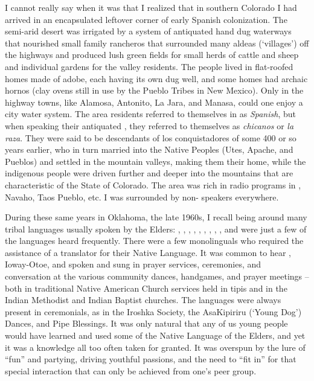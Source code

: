 \documentclass[output=paper]{LSP/langsci}
\begin{document}
I cannot really say when it was that I realized that in southern Colorado I had arrived in an encapsulated leftover corner of early Spanish colonization. The semi-arid desert was irrigated by a system of antiquated hand dug waterways that nourished small family rancheros that surrounded many aldeas (`villages') off the highways and produced lush green fields for small herds of cattle and sheep and individual gardens for the valley residents. The people lived in flat-roofed homes made of adobe, each having its own dug well, and some homes had archaic hornos (clay ovens still in use by the Pueblo Tribes in New Mexico). Only in the highway towns, like Alamosa, Antonito, La Jara, and Manasa, could one enjoy a city water system. The area residents referred to themselves in  as \emph{Spanish}, but when speaking their antiquated , they referred to themselves as \emph{chicanos} or \emph{la raza}. They were said to be descendants of los conquistadores of some 400 or so years earlier, who in turn married into the Native Peoples (Utes, Apache, and Pueblos) and settled in the mountain valleys, making them their home, while the indigenous people were driven further and deeper into the mountains that are characteristic of the State of Colorado. The area was rich in radio programs in , Navaho, Taos Pueblo, etc. I was surrounded by non- speakers everywhere.

During these same years in Oklahoma, the late 1960s, I recall being around many tribal languages usually spoken by the Elders: , , , , , , , , , and  were just a few of the languages heard frequently. There were a few monolinguals who required the assistance of a translator for their Native Language. It was common to hear , Ioway-Otoe, and  spoken and sung in prayer services, ceremonies, and conversation at the various community dances, handgames, and prayer meetings -- both in traditional Native American Church services held in tipis and in the Indian Methodist and Indian Baptist churches. The languages were always present in ceremonials, as in the Iroshka Society, the AsaKipiriru (`Young Dog') Dances, and Pipe Blessings. It was only natural that any of us young people would have learned and used some of the Native Language of the Elders, and yet it was a knowledge all too often taken for granted. It was overspun by the lure of ``fun'' and partying, driving youthful passions, and the need to ``fit in'' for that special interaction that can only be achieved from one's peer group.
\end{document}
